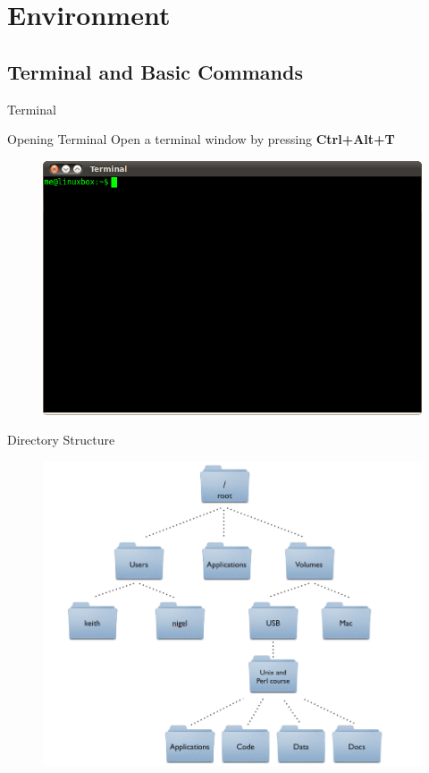 \section{Environment}

\subsection{Terminal and Basic Commands}
\begin{frame}{Terminal}
    \begin{block}{Opening Terminal}
        Open a terminal window by pressing \textbf{Ctrl+Alt+T}
    \end{block}
    \begin{figure}
        \centering
        \includegraphics[width=\textwidth]{images/terminal.png}
    \end{figure}
\end{frame}

\begin{frame}{Directory Structure}
    \begin{figure}
        \centering
        \includegraphics[height=0.7\textheight]{images/directory_tree.png}
    \end{figure}
\end{frame}

